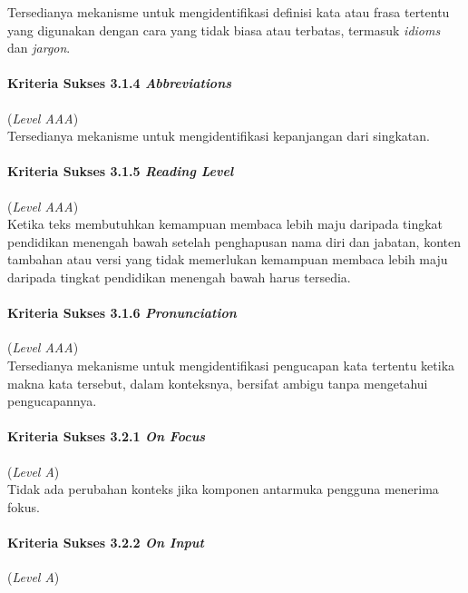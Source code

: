 Tersedianya mekanisme untuk mengidentifikasi definisi kata atau frasa tertentu yang digunakan dengan cara yang tidak biasa atau terbatas, termasuk \textit{idioms} dan \textit{jargon}.

\paragraph{Kriteria Sukses 3.1.4 \textit{Abbreviations}}
\label{subsec:kriteria_3.1.4}
(\textit{Level AAA}) \\

Tersedianya mekanisme untuk mengidentifikasi kepanjangan dari singkatan.

\paragraph{Kriteria Sukses 3.1.5 \textit{Reading Level}}
\label{subsec:kriteria_3.1.5}
(\textit{Level AAA}) \\

Ketika teks membutuhkan kemampuan membaca lebih maju daripada tingkat pendidikan menengah bawah setelah penghapusan nama diri dan jabatan, konten tambahan atau versi yang tidak memerlukan kemampuan membaca lebih maju daripada tingkat pendidikan menengah bawah harus tersedia.

\paragraph{Kriteria Sukses 3.1.6 \textit{Pronunciation}}
\label{subsec:kriteria_3.1.6}
(\textit{Level AAA}) \\

Tersedianya mekanisme untuk mengidentifikasi pengucapan kata tertentu ketika makna kata tersebut, dalam konteksnya, bersifat ambigu tanpa mengetahui pengucapannya.

\paragraph{Kriteria Sukses 3.2.1 \textit{On Focus}}
\label{subsec:kriteria_3.2.1}
(\textit{Level A}) \\

Tidak ada perubahan konteks jika komponen antarmuka pengguna menerima fokus.

\paragraph{Kriteria Sukses 3.2.2 \textit{On Input}}
\label{subsec:kriteria_3.2.2}
(\textit{Level A}) \\

